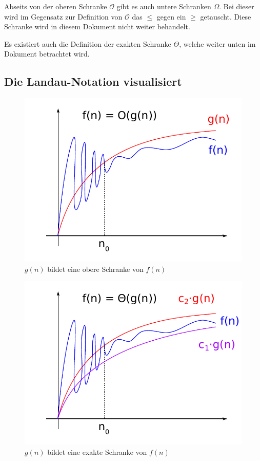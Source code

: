 Abseits von der oberen Schranke $\mathcal{O}$ gibt es auch untere Schranken $\Omega$. Bei dieser wird im Gegensatz zur Definition von $\mathcal{O}$ das $\leq$ gegen ein $\geq$ getauscht. Diese Schranke wird in diesem Dokument nicht weiter behandelt.

Es existiert auch die Definition der exakten Schranke $\Theta$, welche weiter unten im Dokument betrachtet wird.

\subsection{Die Landau-Notation visualisiert}
%
\begin{figure}[p]
 \begin{center}
  \includegraphics{img/upper_bound.pdf}
  \caption{$g(n)$ bildet eine obere Schranke von $f(n)$}
  \label{fig:upper}
 \end{center}
\end{figure}
\begin{figure}[p]
 \begin{center}
  \includegraphics{img/exact_bound.pdf}
  \caption{$g(n)$ bildet eine exakte Schranke von $f(n)$}
  \label{fig:exact}
 \end{center}
\end{figure}

